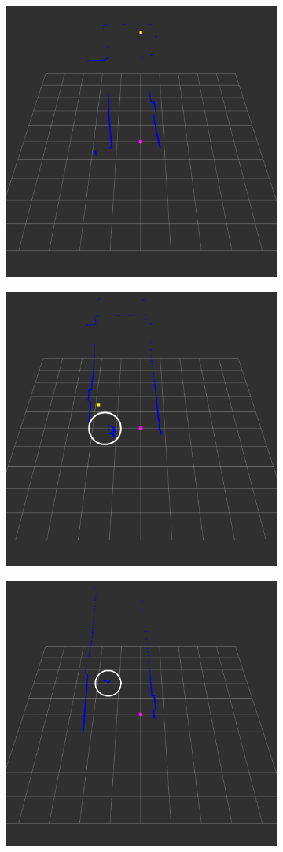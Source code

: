 \documentclass{article}
\begin{document}
\begin{figure}[t]
	\centering
	\begin{subfigure}{.5\textwidth}
		\centering
		\includegraphics[width=.65\linewidth, height=.65\linewidth]{ftd_nn_false_negative_1}
		\caption{}
		\label{fig:drow_false_negative_1}
	\end{subfigure}%
	\begin{subfigure}{.5\textwidth}
		\centering
		\includegraphics[width=.65\linewidth, height=.65\linewidth]{ftd_nn_false_negative_2}
		\caption{}
		\label{fig:drow_false_negative_2}
	\end{subfigure}
	\parbox[b]{\textwidth}{}
	\begin{subfigure}{.5\textwidth}
		\centering
		\includegraphics[width=.65\linewidth, height=.65\linewidth]{ftd_nn_false_positive_1}

\end{subfigure}
\end{figure}
\end{document}
